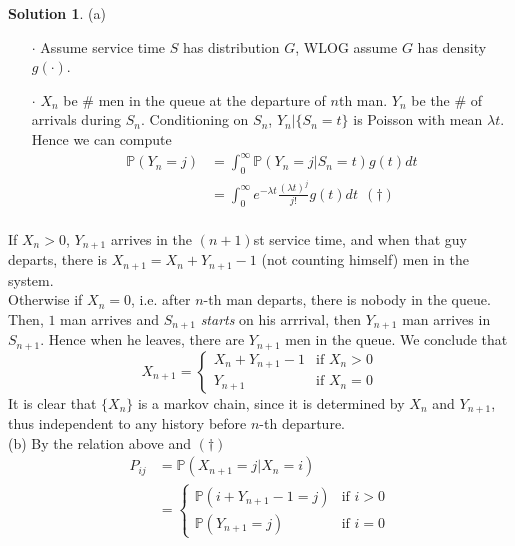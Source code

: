 \documentclass[a4paper, 10pt]{article}
\theoremstyle{definition}
\theoremstyle{hSol}
\newtheorem*{solution}{Solution}
\begin{document}
\begin{solution} (a) 
\begin{itemize}
  \item[$\cdot$] Assume service time $S$ has distribution $G$, WLOG assume $G$ has density $g(\cdot)$.
  \item[$\cdot$] $X_n$ be \# men in the queue at the departure of $n$th man. $Y_n$ be the \# of arrivals during $S_n$. Conditioning on $S_n$, $Y_n|\{S_n=t\}$ is Poisson with mean $\lambda t$. Hence we can compute
  \begin{equation}
    \begin{split}
      \mathbb{P}\left(Y_n=j\right) &= \int_0^{\infty} \mathbb{P}\left(Y_n=j|S_n=t\right)g(t)dt\\
      &= \int_0^{\infty} e^{-\lambda t}\frac{(\lambda t)^j}{j!}g(t)dt ~~(\dag)\\
    \end{split}
  \end{equation}
\end{itemize}
If $X_n>0$, $Y_{n+1}$ arrives in the $(n+1)$st service time, and when that guy departs, there is $X_{n+1}=X_n+Y_{n+1}-1$ (not counting himself) men in the system. \\
Otherwise if $X_n=0$, i.e. after $n$-th man departs, there is nobody in the queue. Then, $1$ man arrives and $S_{n+1}$ \textit{starts} on his arrrival, then $Y_{n+1}$ man arrives in $S_{n+1}$. Hence when he leaves, there are $Y_{n+1}$ men in the queue. We conclude that 
\begin{equation}
  X_{n+1} = \begin{cases}
  X_n + Y_{n+1}-1 & \text{if } X_n>0 \\
  Y_{n+1} & \text{if } X_n =0
  \end{cases}
\end{equation}
It is clear that $\{X_n\}$ is a markov chain, since it is determined by $X_{n}$ and $Y_{n+1}$, thus independent to any history before $n$-th departure. \\
(b) By the relation above and $(\dag)$
\begin{equation}
  \begin{split}
    P_{ij} &= \mathbb{P}\left(X_{n+1}=j|X_n = i\right)\\
    &= 
    \begin{cases}
    \mathbb{P}\left(i+Y_{n+1}-1 = j\right) & \text{if } i>0 \\
    \mathbb{P}\left(Y_{n+1}=j\right) & \text{if } i =0
    \end{cases} \\

\end{split}
\end{equation}
\end{solution}
\end{document}
